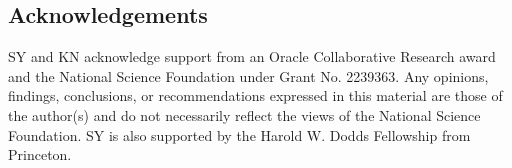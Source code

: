 \subsection*{Acknowledgements}
SY and KN acknowledge support from an Oracle Collaborative Research award and the National Science Foundation under Grant No. 2239363. Any opinions, findings, conclusions, or recommendations expressed in this material are those of the author(s) and do not necessarily reflect the views of the National Science Foundation. SY is also supported by the Harold W. Dodds Fellowship from Princeton. 


